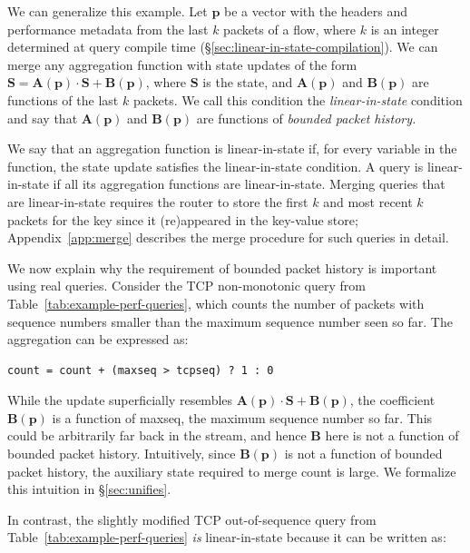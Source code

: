 We can generalize this example. Let $\mathbf{p}$ be a vector with the headers
and performance metadata from the last $k$ packets of a flow, where $k$ is an
integer determined at query compile time
(\S\ref{sec:linear-in-state-compilation}).  We can merge any aggregation
function with state updates of the form $\boldsymbol{S} =
\boldsymbol{A}(\mathbf{p}) \cdot \boldsymbol{S} + \boldsymbol{B}(\mathbf{p})$,
where $\boldsymbol{S}$ is the state, and $\boldsymbol{A}(\mathbf{p})$ and
$\boldsymbol{B}(\mathbf{p})$ are functions of the last $k$ packets. We call
this condition the {\em linear-in-state} condition and say that
$\boldsymbol{A}(\mathbf{p})$ and $\boldsymbol{B}(\mathbf{p})$ are functions of
{\em bounded packet history.}

 We say that an aggregation function is linear-in-state if, for every variable
in the function, the state update satisfies the linear-in-state condition. A
query is linear-in-state if all its aggregation functions are linear-in-state.
Merging queries that are linear-in-state requires the router to store the first
$k$ and most recent $k$ packets for the key since it (re)appeared in the
key-value store; Appendix~\ref{app:merge} describes the merge procedure for
such queries in detail.

We now explain why the requirement of bounded packet history is important using
real queries.  Consider the TCP non-monotonic query from
Table~\ref{tab:example-perf-queries}, which counts the number of packets with
sequence numbers smaller than the maximum sequence number seen so far. The
aggregation can be expressed as:

\begin{lstlisting}
count = count + (maxseq > tcpseq) ? 1 : 0
\end{lstlisting}

While the update superficially resembles
$\boldsymbol{A}(\mathbf{p}) \cdot \boldsymbol{S} + \boldsymbol{B}(\mathbf{p})$,
the coefficient $\boldsymbol{B}(\mathbf{p})$ is a function of {\ct maxseq}, the
maximum sequence number so far. This could be arbitrarily far back in the
stream, and hence $\boldsymbol{B}$ here is not a function of bounded packet
history. Intuitively, since $\boldsymbol{B}(\mathbf{p})$ is not a function of
bounded packet history, the auxiliary state required to merge {\ct count} is
large. We formalize this intuition in \S\ref{sec:unifies}.

In contrast, the slightly modified TCP out-of-sequence query from
Table~\ref{tab:example-perf-queries} {\em is} linear-in-state because it can
be written as:

